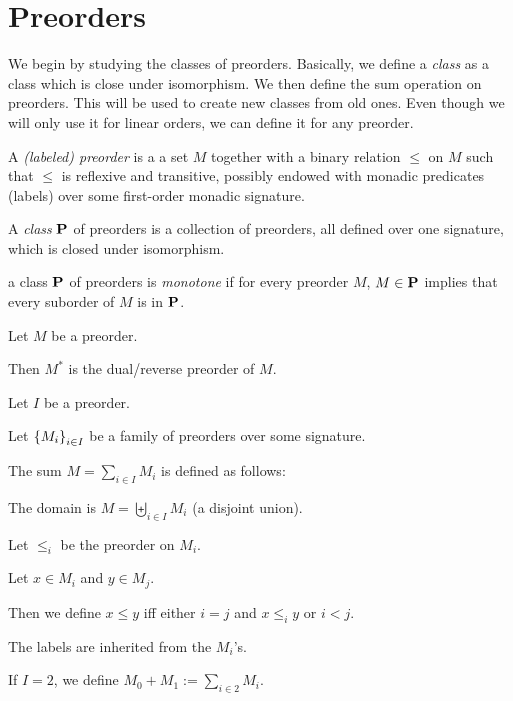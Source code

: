 \section{Preorders}
We begin by studying the classes of preorders. Basically, we define a \emph{class} as a class which is close under
isomorphism. We then define the sum operation on preorders. This will be used to create new classes from old ones.
Even though we will only use it for linear orders,
we can define it for any preorder.

\begin{definitions} [Preorder]
  A \emph{(labeled) preorder} is a a set $M$
  together with a binary relation $\le$ on $M$ such that
  $\le$ is reflexive and transitive,
  possibly endowed with monadic predicates (labels)
  over some first-order monadic signature.
\end{definitions}

\begin{definition}
  A \emph{class} $\mathbf{P}$ of preorders is a collection of preorders,
  all defined over one signature,
  which is closed under isomorphism.
\end{definition}

\begin{definition}
  a class $\mathbf{P}$ of preorders is \emph{monotone} if for every preorder $M$,
  $M \in \mathbf{P}$ implies that every suborder of $M$ is in $\mathbf{P}$.
\end{definition}

\begin{definition}
  Let $M$ be a preorder.

  Then $M^\ast$ is the dual/reverse preorder of $M$.
\end{definition}

\begin{definition}
  Let $I$ be a preorder.

  Let $\left\{ {M_i} \right\}_{i \in I}$ be a family of preorders
  over some signature.

  The sum $M = \sum_{i \in I} M_i$ is defined as follows:

  The domain is $M = \biguplus_{i \in I} M_i$ (a disjoint union).

  Let $\le_i$ be the preorder on $M_i$.

  Let $x \in M_i$ and $y \in M_j$.

  Then we define $x \le y$ iff either
  $i = j$ and $x \le_i y$ or $i < j$.

  The labels are inherited from the $M_i$'s.

  If $I = 2$, we define $M_0 + M_1 := \sum_{i \in 2} M_i$.
\end{definition}

